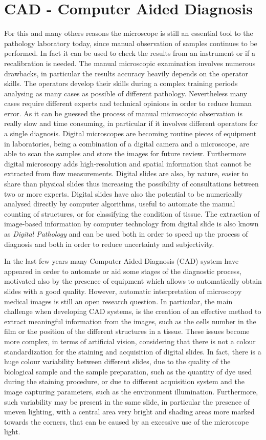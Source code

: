 \documentclass[final,a4paper,12pt,english]{UnicaPhdThesis3}
\begin{document}
\section{CAD - Computer Aided Diagnosis} %
For this and many others reasons the microscope is still an essential tool to the pathology laboratory today, since manual observation of samples continues to be performed. In fact it can be used to check the results from an instrument or if a recalibration is needed. The manual microscopic examination involves numerous drawbacks, in particular the results accuracy heavily depends on the operator skills. The operators develop their skills during a complex training periods analysing as many cases as possible of different pathology. Nevertheless many cases require different experts and technical opinions in order to reduce human error. As it can be guessed the process of manual microscopic observation is really slow and time consuming, in particular if it involves different operators for a single diagnosis. Digital microscopes are becoming routine pieces of equipment in laboratories, being a combination of a digital camera and a microscope, are able to scan the samples and store the images for future review. Furthermore digital microscopy adds high-resolution and spatial information that cannot be extracted from flow measurements. Digital slides are also, by nature, easier to share than physical slides thus increasing the possibility of consultations between two or more experts. Digital slides have also the potential to be numerically analysed directly by computer algorithms, useful to automate the manual counting of structures, or for classifying the condition of tissue. The extraction of image-based information by computer technology from digital slide is also known as \textit{Digital Pathology} and can be used both in order to speed up the process of diagnosis and both in order to reduce uncertainty and subjectivity.

In the last few years many Computer Aided Diagnosis (\acs{CAD}) system have appeared in order to automate or aid some stages of the diagnostic process, motivated also by the presence of equipment which allows to automatically obtain slides with a good quality. However, automatic interpretation of microscopy medical images is still an open research question. In particular, the main challenge when developing CAD systems, is the creation of an effective method to extract meaningful information from the images, such as the cells number in the film or the position of the different structures in a tissue. These issues become more complex, in terms of artificial vision, considering that there is not a colour standardization for the staining and acquisition of digital slides. In fact, there is a huge colour variability between different slides, due to the quality of the biological sample and the sample preparation, such as the quantity of dye used during the staining procedure, or due to different acquisition system and the image capturing parameters, such as the environment illumination. Furthermore, such variability may be present in the same slide, in particular the presence of uneven lighting, with a central area very bright and shading areas more marked towards the corners, that can be caused by an excessive use of the microscope light.
\end{document}

